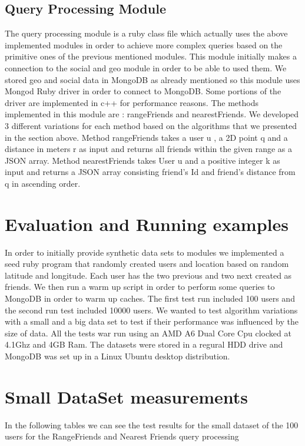 \documentclass[prodmode,acmtods]{acmsmall} %
\begin{document}
\subsection{Query Processing Module}
The query processing module is a ruby class file which actually uses the above implemented modules in order to achieve more complex queries based on the primitive ones of the previous mentioned modules.
This module initially makes a connection to the social and geo module in order to be able to used them. We stored geo and social data in MongoDB as already mentioned so this module uses Mongod Ruby driver in order to connect to MongoDB. Some portions of the driver are implemented in c++ for performance reasons. The methods implemented in this module are : rangeFriends and nearestFriends. We developed 3 different variations for each method based on the algorithms that we presented in the section above.
Method rangeFriends takes a user u , a 2D point q and a distance in meters r as input and returns all friends within the given range as a JSON array.
Method nearestFriends takes User u and a positive integer k as input and returns a JSON array consisting friend's Id and friend's distance from q in ascending order.



\section{Evaluation and Running examples}
In order to initially provide synthetic data sets to modules we implemented a seed ruby program that randomly created users and location based on random latitude and longitude. Each user has the two previous and two next created as friends. We then run a warm up script in order to perform some queries to MongoDB in order to warm up caches. The first test run included 100 users and the second run test included 10000 users. We wanted to test algorithm variations with a small and a big data set to test if their performance was influenced by the size of data. All the tests war run using an AMD A6 Dual Core Cpu clocked at 4.1Ghz and 4GB Ram. The datasets were stored in a regural HDD drive and MongoDB was set up in a Linux Ubuntu desktop distribution.

\section{Small DataSet measurements}
In the following tables we can see the test results for the small dataset of the 100 users
for the RangeFriends and Nearest Friends query processing
\newline
\end{document}
